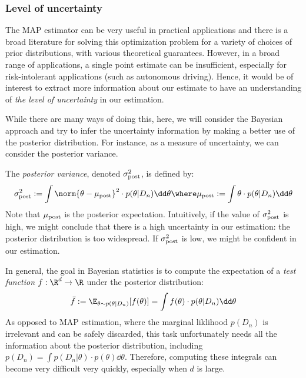 \documentclass[toc, titlepaged]{../cs-classes/cs-classes}
\begin{document}
\subsubsection{Level of uncertainty}
The MAP estimator can be very useful in practical applications and there is a broad literature for solving this optimization problem for a variety of choices of prior distributions, with various theoretical guarantees. However, in a broad range of applications, a single point estimate can be insufficient, especially for risk-intolerant applications (such as autonomous driving). Hence, it would be of interest to extract more information about our estimate to have an understanding of \emph{the level of uncertainty} in our estimation.

While there are many ways of doing this, here, we will consider the Bayesian approach and try to infer the uncertainty information by making a better use of the posterior distribution. For instance, as a measure of uncertainty, we can consider the posterior variance.

\begin{definition}
    The \emph{posterior variance}, denoted $\sigma^2_{\textnormal{post}}$, is defined by:
    \begin{equation}
        \sigma^2_{\textnormal{post}} := \int\norm{\theta-\mu_{\textnormal{post}}}^2 \cdot p(\theta|D_n)\dd\theta 
        \where \mu_{\textnormal{post}} := \int \theta\cdot p(\theta|D_n)\dd\theta
    \end{equation}
    Note that $\mu_{\textnormal{post}}$ is the posterior expectation. Intuitively, if the value of $\sigma^2_{\textnormal{post}}$ is high, we might conclude that there is a high uncertainty in our estimation: the posterior distribution is too widespread. If $\sigma^2_{\textnormal{post}}$ is low, we might be confident in our estimation.
\end{definition}

In general, the goal in Bayesian statistics is to compute the expectation of a \emph{test function} $f:\R^d\to\R$ under the posterior distribution:
\begin{equation}
    \label{eq:test-function-expectation}
    \bar{f} := \E_{\theta\sim p(\theta|D_n)}[f(\theta)] = \int f(\theta)\cdot p(\theta|D_n)\dd\theta
\end{equation}
As opposed to MAP estimation, where the marginal liklihood $p(D_n)$ is irrelevant and can be safely discarded, this task unfortunately needs all the information about the posterior distribution, including $p(D_n)=\int p(D_n|\theta)\cdot p(\theta)\dd\theta$. Therefore, computing these integrals can become very difficult very quickly, especially when $d$ is large.
\end{document}
